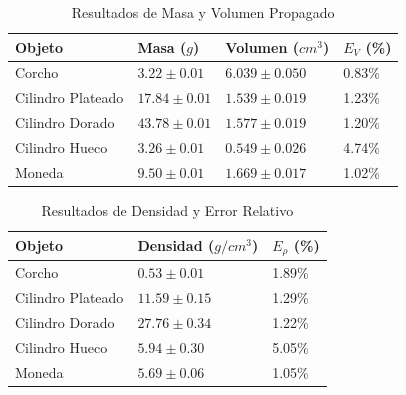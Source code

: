 
\begin{table}[h!]
\centering
\caption{Resultados de Masa y Volumen Propagado}
\label{tab:masa_vol}
    \begin{tabular}{llll}
    \toprule
    \toprule
    \midrule
    Objeto & Masa ($g$) & Volumen ($cm^3$) & $E_V$ (\%) \\
    \midrule
    Corcho & $3.22 \pm 0.01$ & $6.039 \pm 0.050$ & 0.83\% \\
    Cilindro Plateado & $17.84 \pm 0.01$ & $1.539 \pm 0.019$ & 1.23\% \\
    Cilindro Dorado & $43.78 \pm 0.01$ & $1.577 \pm 0.019$ & 1.20\% \\
    Cilindro Hueco & $3.26 \pm 0.01$ & $0.549 \pm 0.026$ & 4.74\% \\
    Moneda & $9.50 \pm 0.01$ & $1.669 \pm 0.017$ & 1.02\% \\
    \bottomrule
    \bottomrule
    \end{tabular}
\end{table}

\vspace{0.5cm} %

\begin{table}[h!]
\centering
\caption{Resultados de Densidad y Error Relativo}
\label{tab:densidad}
    \begin{tabular}{lll}
    \toprule
    \toprule
    \midrule
    Objeto & Densidad ($g/cm^3$) & $E_{\rho}$ (\%) \\
    \midrule
    Corcho & $0.53 \pm 0.01$ & 1.89\% \\
    Cilindro Plateado & $11.59 \pm 0.15$ & 1.29\% \\
    Cilindro Dorado & $27.76 \pm 0.34$ & 1.22\% \\
    Cilindro Hueco & $5.94 \pm 0.30$ & 5.05\% \\
    Moneda & $5.69 \pm 0.06$ & 1.05\% \\
    \bottomrule
    \bottomrule
    \end{tabular}
\end{table}
